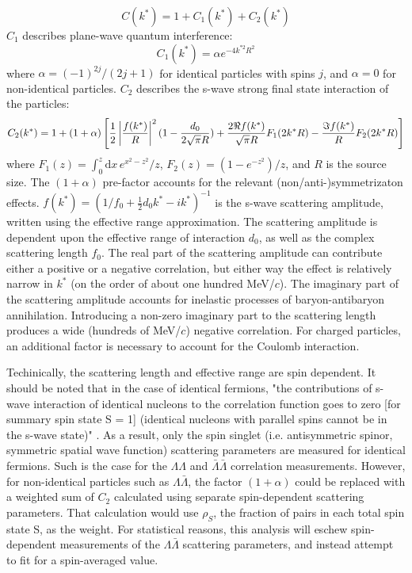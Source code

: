 \begin{equation}
C(k^*)= 1 + C_1(k^*)+C_2(k^*)
\end{equation}
$C_1$ describes plane-wave quantum interference:
\begin{equation}
C_1(k^*) = \alpha e^{-4k^{*2}R^2}
\end{equation}
where $\alpha = (-1)^{2j}/(2j+1)$ for identical particles with spins $j$, and $\alpha = 0$ for non-identical particles.  $C_2$ describes the s-wave strong final state interaction of the particles:
\begin{equation}
\label{eq:Lednicky}
C_2(k^*)= 1+ (1+\alpha)\left[\frac{1}{2}\left\lvert\frac{f(k^*)}{R}\right\rvert^2(1-\frac{d_0}{2\sqrt{\pi}R})+\frac{2\Re f(k^*)}{\sqrt{\pi}R}F_1(2k^*R)-\frac{\Im f(k^*)}{R}F_2(2k^*R)\right]
\end{equation}
where $F_1(z) = \int_0^z \! \mathrm{d}x \, e^{x^2-z^2}/z$,  $F_2(z) = (1-e^{-z^2})/z$, and $R$ is the source size. The $(1+\alpha)$ pre-factor accounts for the relevant (non/anti-)symmetrizaton effects.  $f(k^*)=(1/f_0+\frac{1}{2}d_0k^*-ik^*)^{-1}$ is the s-wave scattering amplitude, written using the effective range approximation.  The scattering amplitude is dependent upon the effective range of interaction $d_0$, as well as the complex scattering length $f_0$.  The real part of the scattering amplitude can contribute either a positive or a negative correlation, but either way the effect is relatively narrow in $k^*$ (on the order of about one hundred MeV/$c$).  The imaginary part of the scattering amplitude accounts for inelastic processes of baryon-antibaryon annihilation.  Introducing a non-zero imaginary part to the scattering length produces a wide (hundreds of MeV/$c$) negative correlation.  For charged particles, an additional factor \cite{Aamodt:2011kd} is necessary to account for the Coulomb interaction.

Techinically, the scattering length and effective range are spin dependent.  It should be noted that in the case of identical fermions, "the contributions of s-wave interaction of identical nucleons to the correlation function goes to zero [for summary spin state S = 1] (identical nucleons with parallel spins cannot be in the s-wave state)" \cite{lednicky82}.  As a result, only the spin singlet (i.e. antisymmetric spinor, symmetric spatial wave function) scattering parameters are measured for identical fermions.  Such is the case for the $\Lambda\Lambda$ and $\bar{\Lambda}\bar{\Lambda}$ correlation measurements.  However, for non-identical particles such as $\Lambda\bar{\Lambda}$, the factor $(1+\alpha)$ could be replaced with a weighted sum of $C_2$ calculated using separate spin-dependent scattering parameters.  That calculation would use $\rho_S$, the fraction of pairs in each total spin state S, as the weight.  For statistical reasons, this analysis will eschew spin-dependent measurements of the $\Lambda\bar{\Lambda}$ scattering parameters, and instead attempt to fit for a spin-averaged value.


